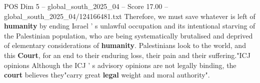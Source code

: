 \begin{textsample}{POS Dim 5 – global\_south\_2025\_04 – Score 17.00 – global\_south\_2025\_04/124166481.txt}
Therefore, we must save whatever is left of \textbf{humanity} by ending Israel ' s unlawful occupation and its intentional starving of the Palestinian population, who are being systematically brutalised and deprived of elementary considerations of \textbf{humanity}.
Palestinians look to the world, and this \textbf{Court}, for an end to their enduring loss, their pain and their suffering."ICJ opinions Although the ICJ ' s advisory opinions are not legally binding, the \textbf{court} believes they"carry great \textbf{legal} weight and moral authority".

\end{textsample}
